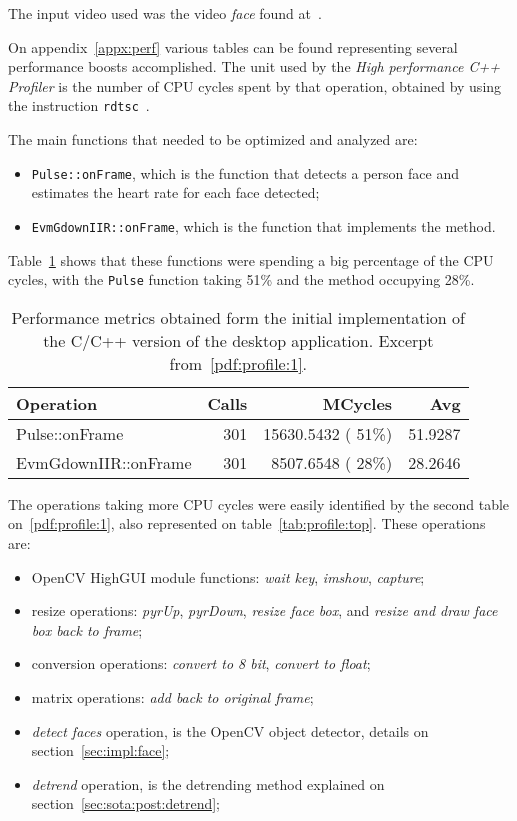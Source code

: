 The input video used was the video \emph{face} found at~\cite{Wu2013Eulerian}.

On appendix~\ref{appx:perf} various tables can be found representing
several performance boosts accomplished. The unit used by the
\emph{High performance C++ Profiler} is the number of CPU cycles spent by
that operation, obtained by using the instruction
\texttt{rdtsc}~\cite{Andrew2013High}.

The main functions that needed to be optimized and analyzed are:

\begin{itemize}
  \item \texttt{Pulse::onFrame}, which is the function that detects a
        person face and estimates the heart rate for each face detected;
  \item \texttt{EvmGdownIIR::onFrame}, which is the function that
        implements the \evm{} method.
\end{itemize}

Table~\ref{tab:profile:initial} shows that these functions were spending
a big percentage of the CPU cycles, with the \texttt{Pulse} function
taking 51\% and the \evm{} method occupying 28\%.

\begin{table}[t]
  \centering
  \begin{tabular}{lrrr}
    \hline
    Operation & Calls & MCycles & Avg \\
    \hline
    Pulse::onFrame        & 301 & 15630.5432 ( 51\%) & 51.9287 \\
    EvmGdownIIR::onFrame  & 301 &  8507.6548 ( 28\%) & 28.2646 \\
    \hline
  \end{tabular}
  \caption{
    Performance metrics obtained form the initial implementation of the C/C++
    version of the desktop application. Excerpt from~\ref{pdf:profile:1}.
  }
  \label{tab:profile:initial}
\end{table}

The operations taking more CPU cycles were easily identified by the
second table on~\ref{pdf:profile:1}, also represented on
table~\ref{tab:profile:top}. These operations are:

\begin{itemize}
  \item OpenCV HighGUI module functions: \emph{wait key}, \emph{imshow},
        \emph{capture};
  \item resize operations: \emph{pyrUp}, \emph{pyrDown}, \emph{resize face box},
        and \emph{resize and draw face box back to frame};
  \item conversion operations: \emph{convert to 8 bit}, \emph{convert to float};
  \item matrix operations: \emph{add back to original frame};
  \item \emph{detect faces} operation, is the OpenCV object detector, details on
        section~\ref{sec:impl:face};
  \item \emph{detrend} operation, is the detrending method explained on
        section~\ref{sec:sota:post:detrend};
\end{itemize}

